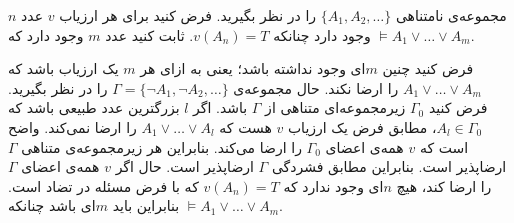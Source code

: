 مجموعه‌ی نامتناهی
$\{A_1,A_2,\ldots\}$
را در نظر بگیرید. فرض کنید برای هر ارزیاب $v$ عدد $n$ وجود دارد چنانکه $v(A_n)=T$. ثابت کنید عدد $m$ وجود دارد که
$\models A_1\vee\ldots\vee A_m$.
\begin{ans}
  فرض کنید چنین $m$ای وجود نداشته باشد؛ یعنی به ازای هر $m$ یک ارزیاب باشد که\linebreak
  $A_1\vee\ldots\vee A_m$
  را ارضا نکند. حال مجموعه‌ی
  $\Gamma=\{\neg A_1,\neg A_2,\ldots\}$
  را در نظر بگیرید. فرض کنید $\Gamma_0$ زیرمجموعه‌ای متناهی از $\Gamma$ باشد. اگر $l$ بزرگترین عدد طبیعی باشد که $A_l\in\Gamma_0$، مطابق فرض یک ارزیاب $v$ هست که
  $A_1\vee\ldots\vee A_l$
  را ارضا نمی‌کند. واضح است که $v$ همه‌ی اعضای $\Gamma_0$ را ارضا می‌کند. بنابراین هر زیرمجموعه‌ی متناهی $\Gamma$ ارضاپذیر است. بنابراین مطابق فشردگی $\Gamma$ ارضاپذیر است. حال اگر $v$ همه‌ی اعضای $\Gamma$ را ارضا کند، هیچ $n$ای وجود ندارد که $v(A_n)=T$ که با فرض مسئله در تضاد است. بنابراین باید $m$ای باشد چنانکه
  $\models A_1\vee\ldots\vee A_m$.
\end{ans}